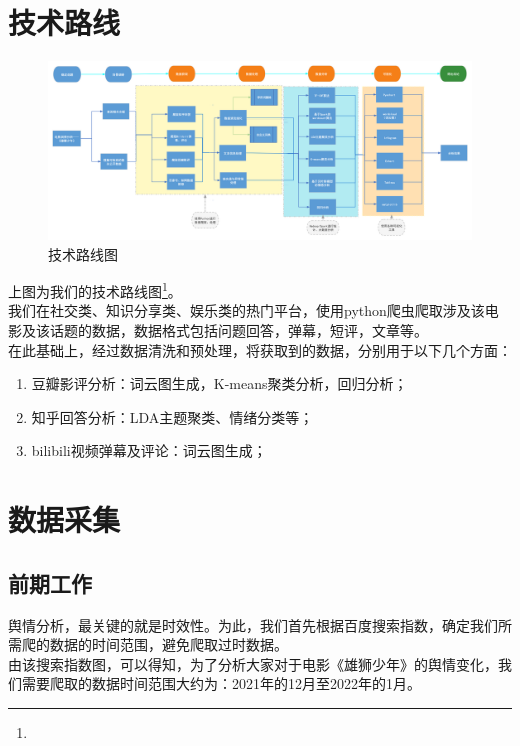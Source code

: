 \documentclass[12pt,a4paper,utf8]{article}
\begin{document}
\section{技术路线}
\begin{figure}[H]
    \centering
    \includegraphics[width=1\textwidth]{images/技术路线.png}  
    \caption{技术路线图} 
\end{figure}  

上图为我们的技术路线图\footnote{\color{red}{建议放大查看}}。\\

我们在社交类、知识分享类、娱乐类的热门平台，使用python爬虫爬取涉及该电影及该话题的数据，数据格式包括问题回答，弹幕，短评，文章等。 \\

在此基础上，经过数据清洗和预处理，将获取到的数据，分别用于以下几个方面：
\begin{enumerate}
\item 豆瓣影评分析：词云图生成，K-means聚类分析，回归分析；
\item 知乎回答分析：LDA主题聚类、情绪分类等；
\item bilibili视频弹幕及评论：词云图生成；
\end{enumerate}  

\section{数据采集}

\subsection{前期工作}
舆情分析，最关键的就是时效性。为此，我们首先根据百度搜索指数，确定我们所需爬的数据的时间范围，避免爬取过时数据。\\ 

由该搜索指数图，可以得知，为了分析大家对于电影《雄狮少年》的舆情变化，我们需要爬取的数据时间范围大约为：2021年的12月至2022年的1月。
\end{document}

